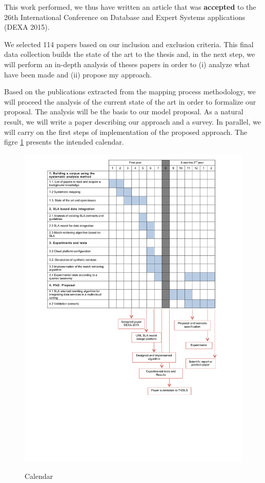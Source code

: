 \documentclass[12pt,a4paper,oneside]{report}
\begin{document}
This work performed, we thus have written an article that was \textbf{accepted} to the 26th International Conference on Database and Expert Systems applications (DEXA 2015).

We selected 114 papers based on our inclusion and exclusion criteria. This final data collection builds the state of the art to the thesis and, in the next step, we will perform an in-depth analysis of theses papers in order to (i) analyze what have been made and (ii) propose my approach.  

\bigskip
Based on the publications extracted from the mapping process methodology, we will proceed the analysis of the current state of the art in order to formalize our proposal. The analysis will be the basis to our model proposal. As a natural result, we will write a paper describing our approach and a survey. In parallel, we will carry on the first steps of implementation of the proposed approach.
The figre \ref{fig:calendar} presents the intended calendar. 


\begin{figure}[!h]
\center
\includegraphics[scale=0.95]{calendario.pdf} 
\label{fig:calendar}\caption{Calendar}
\end{figure}



\end{document}
